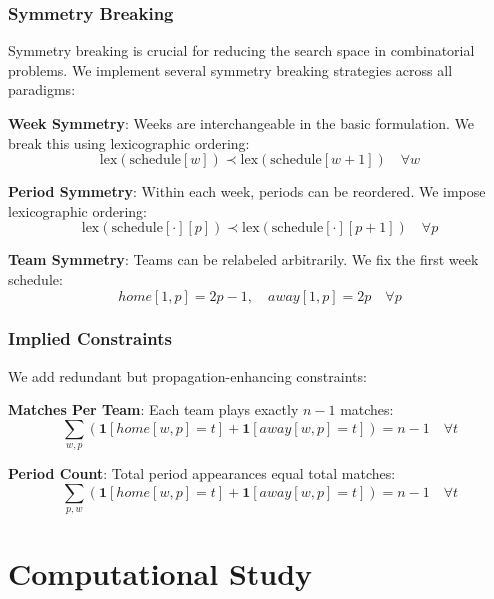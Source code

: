 \documentclass[11pt]{article}
\begin{document}
\subsubsection{Symmetry Breaking}

Symmetry breaking is crucial for reducing the search space in combinatorial problems. We implement several symmetry breaking strategies across all paradigms:

\textbf{Week Symmetry}: Weeks are interchangeable in the basic formulation. We break this using lexicographic ordering:
\begin{equation}
\text{lex}(\text{schedule}[w]) \prec \text{lex}(\text{schedule}[w+1]) \quad \forall w
\end{equation}

\textbf{Period Symmetry}: Within each week, periods can be reordered. We impose lexicographic ordering:
\begin{equation}
\text{lex}(\text{schedule}[\cdot][p]) \prec \text{lex}(\text{schedule}[\cdot][p+1]) \quad \forall p
\end{equation}

\textbf{Team Symmetry}: Teams can be relabeled arbitrarily. We fix the first week schedule:
\begin{equation}
home[1,p] = 2p-1, \quad away[1,p] = 2p \quad \forall p
\end{equation}

\subsubsection{Implied Constraints}

We add redundant but propagation-enhancing constraints:

\textbf{Matches Per Team}: Each team plays exactly $n-1$ matches:
\begin{equation}
\sum_{w,p} (\mathbf{1}[home[w,p] = t] + \mathbf{1}[away[w,p] = t]) = n-1 \quad \forall t
\end{equation}

\textbf{Period Count}: Total period appearances equal total matches:
\begin{equation}
\sum_{p,w} (\mathbf{1}[home[w,p] = t] + \mathbf{1}[away[w,p] = t]) = n-1 \quad \forall t
\end{equation}

\section{Computational Study}
\end{document}

